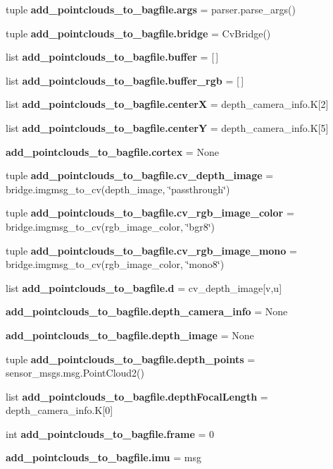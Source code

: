 \begin{DoxyCompactItemize}
\item 
tuple {\bf add\-\_\-pointclouds\-\_\-to\-\_\-bagfile.\-args} = parser.\-parse\-\_\-args()
\item 
tuple {\bf add\-\_\-pointclouds\-\_\-to\-\_\-bagfile.\-bridge} = \-Cv\-Bridge()
\item 
list {\bf add\-\_\-pointclouds\-\_\-to\-\_\-bagfile.\-buffer} = [$\,$]
\item 
list {\bf add\-\_\-pointclouds\-\_\-to\-\_\-bagfile.\-buffer\-\_\-rgb} = [$\,$]
\item 
list {\bf add\-\_\-pointclouds\-\_\-to\-\_\-bagfile.\-center\-X} = depth\-\_\-camera\-\_\-info.\-K[2]
\item 
list {\bf add\-\_\-pointclouds\-\_\-to\-\_\-bagfile.\-center\-Y} = depth\-\_\-camera\-\_\-info.\-K[5]
\item 
{\bf add\-\_\-pointclouds\-\_\-to\-\_\-bagfile.\-cortex} = \-None
\item 
tuple {\bf add\-\_\-pointclouds\-\_\-to\-\_\-bagfile.\-cv\-\_\-depth\-\_\-image} = bridge.\-imgmsg\-\_\-to\-\_\-cv(depth\-\_\-image, \char`\"{}passthrough\char`\"{})
\item 
tuple {\bf add\-\_\-pointclouds\-\_\-to\-\_\-bagfile.\-cv\-\_\-rgb\-\_\-image\-\_\-color} = bridge.\-imgmsg\-\_\-to\-\_\-cv(rgb\-\_\-image\-\_\-color, \char`\"{}bgr8\char`\"{})
\item 
tuple {\bf add\-\_\-pointclouds\-\_\-to\-\_\-bagfile.\-cv\-\_\-rgb\-\_\-image\-\_\-mono} = bridge.\-imgmsg\-\_\-to\-\_\-cv(rgb\-\_\-image\-\_\-color, \char`\"{}mono8\char`\"{})
\item 
list {\bf add\-\_\-pointclouds\-\_\-to\-\_\-bagfile.\-d} = cv\-\_\-depth\-\_\-image[v,u]
\item 
{\bf add\-\_\-pointclouds\-\_\-to\-\_\-bagfile.\-depth\-\_\-camera\-\_\-info} = \-None
\item 
{\bf add\-\_\-pointclouds\-\_\-to\-\_\-bagfile.\-depth\-\_\-image} = \-None
\item 
tuple {\bf add\-\_\-pointclouds\-\_\-to\-\_\-bagfile.\-depth\-\_\-points} = sensor\-\_\-msgs.\-msg.\-Point\-Cloud2()
\item 
list {\bf add\-\_\-pointclouds\-\_\-to\-\_\-bagfile.\-depth\-Focal\-Length} = depth\-\_\-camera\-\_\-info.\-K[0]
\item 
int {\bf add\-\_\-pointclouds\-\_\-to\-\_\-bagfile.\-frame} = 0
\item 
{\bf add\-\_\-pointclouds\-\_\-to\-\_\-bagfile.\-imu} = msg
\item 

\end{DoxyCompactItemize}
